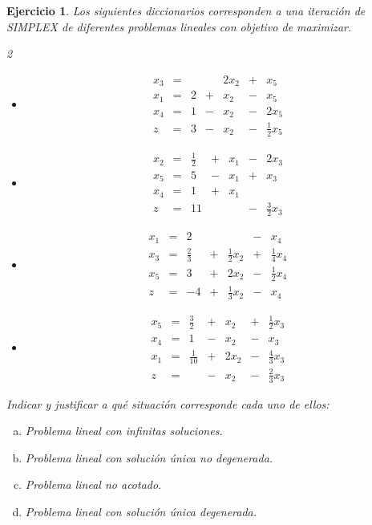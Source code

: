 \documentclass[a4paper,oneside,12pt]{amsart}
\newtheorem{quest}{Ejercicio}
\begin{document}


\begin{quest} 
Los siguientes diccionarios corresponden a una iteración de SIMPLEX de diferentes problemas lineales con objetivo de maximizar.

\begin{multicols}{2}
    \begin{itemize}
        \item[1)]
            \[
            \begin{array}{rrrrrrr}
                x_3&=&&&2x_2&+&x_5\\
                x_1&=&2&+&x_2&-&x_5\\
                x_4&=&1&-&x_2&-&2x_5\\ \hline
                z&=&3&-&x_2&-&\frac{1}{2}x_5
            \end{array}
            \]
        \item[3)]
            \[
            \begin{array}{rrrrrrr}
                x_2&=&\frac{1}{2}&+&x_1&-&2x_3\\
                x_5&=&5&-&x_1&+&x_3\\
                x_4&=&1&+&x_1&&\\ \hline
                z&=&11&&&-&\frac{3}{2}x_3
            \end{array}
            \]
        \item[2)]
            \[
            \begin{array}{rrrrrrr}
                x_1&=&2&&&-&x_4\\
                x_3&=&\frac{2}{3}&+&\frac{1}{2}x_2&+&\frac{1}{4}x_4\\
                x_5&=&3&+&2x_2&-&\frac{1}{2}x_4\\ \hline
                z&=&-4&+&\frac{1}{3}x_2&-&x_4
            \end{array}
            \]
        \item[4)]
            \[
            \begin{array}{rrrrrrr}
                x_5&=&\frac{3}{2}&+&x_2&+&\frac{1}{2}x_3\\
                x_4&=&1&-&x_2&-&x_3\\
                x_1&=&\frac{1}{10}&+&2x_2&-&\frac{4}{3}x_3\\ \hline
                z&=&&-&x_2&-&\frac{2}{3}x_3
            \end{array}
            \]
    \end{itemize}
\end{multicols}
Indicar y justificar a qué situación corresponde cada uno de ellos:
\begin{enumerate}[a)]
    \item Problema lineal con infinitas soluciones.
    \item Problema lineal con solución única no degenerada.
    \item Problema lineal no acotado.
    \item Problema lineal con solución única degenerada.
\end{enumerate}
\end{quest}
\end{document}
